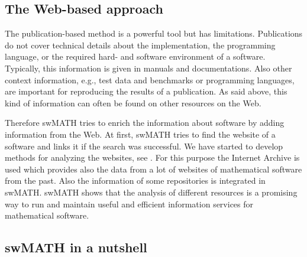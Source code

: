 \documentclass[12pt]{article}
\begin{document}
\subsection{The Web-based approach}
The publication-based  method is a powerful tool but has limitations. Publications do not cover technical details about the implementation, the programming language, or the required hard- and software environment of a software. Typically, this information is given in manuals and documentations. Also other context information, e.g., test data and benchmarks or programming languages, are important for reproducing the results of a publication. As said above, this kind of information can often  be found on other resources on the Web.

Therefore swMATH tries to enrich the information about software by adding information from the Web. At first, swMATH tries to find the website of a software and links it if the search was successful.
We have started to develop methods for analyzing the websites, see \cite{TPDL}. For this purpose the Internet Archive \cite{IA} is used which provides also the data from a lot of websites of mathematical software from the past.
Also the information of some repositories is integrated in swMATH.
swMATH shows that the analysis of different resources is a promising way to run and maintain useful and efficient information services for mathematical software.\par


\subsection{swMATH in a nutshell}
\end{document}
